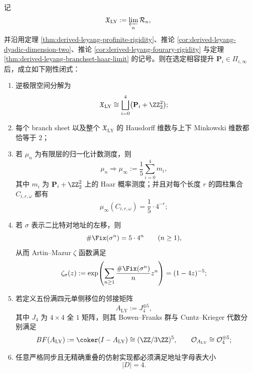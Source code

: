 \begin{theorem}\label{thm:derived-leyang-branch-tower-fourary-haar-ck-rigidity}
记
\[
\mathfrak X_{\mathrm{LY}}:=\varprojlim_n \mathcal R_n,
\]
并沿用定理 \ref{thm:derived-leyang-profinite-rigidity}、推论 \ref{cor:derived-leyang-dyadic-dimension-two}、推论 \ref{cor:derived-leyang-fourary-rigidity} 与定理 \ref{thm:derived-leyang-branchset-haar-limit} 的记号。则在选定相容提升 \(\mathbf P_i\in\Pi_{i,\infty}\) 后，成立如下刚性闭式：
\begin{enumerate}
  \item 逆极限空间分解为
  \[
  \mathfrak X_{\mathrm{LY}}
  \cong
  \bigsqcup_{i=0}^{4}\bigl(\mathbf P_i+\ZZ_2^2\bigr);
  \]
  \item 每个 branch sheet 以及整个 \(\mathfrak X_{\mathrm{LY}}\) 的 Hausdorff 维数与上下 Minkowski 维数都恰等于 \(2\)；
  \item 若 \(\mu_n\) 为有限层的归一化计数测度，则
  \[
  \mu_n\Rightarrow \mu_\infty:=\frac15\sum_{i=0}^{4}m_i,
  \]
  其中 \(m_i\) 为 \(\mathbf P_i+\ZZ_2^2\) 上的 Haar 概率测度；并且对每个长度 \(r\) 的圆柱集合 \(C_{i,r,\omega}\) 都有
  \[
  \mu_\infty(C_{i,r,\omega})=\frac15\cdot 4^{-r};
  \]
  \item 若 \(\sigma\) 表示二比特对地址的左移，则
  \[
  \#\Fix(\sigma^n)=5\cdot 4^n
  \qquad (n\ge 1),
  \]
  从而 Artin--Mazur \(\zeta\) 函数满足
  \[
  \zeta_\sigma(z)
  :=
  \exp\!\left(
  \sum_{n\ge 1}\frac{\#\Fix(\sigma^n)}{n}z^n
  \right)
  =
  (1-4z)^{-5};
  \]
  \item 若定义五份满四元单侧移位的邻接矩阵
  \[
  A_{\mathrm{LY}}:=J_4^{\oplus 5},
  \]
  其中 \(J_4\) 为 \(4\times 4\) 全 \(1\) 矩阵，则其 Bowen--Franks 群与 Cuntz--Krieger 代数分别满足
  \[
  BF(A_{\mathrm{LY}})
  :=
  \coker(I-A_{\mathrm{LY}})
  \cong
  (\ZZ/3\ZZ)^5,
  \qquad
  \mathcal O_{A_{\mathrm{LY}}}
  \cong
  \mathcal O_4^{\oplus 5};
  \]
  \item 任意严格同步且无精确重叠的仿射实现都必须满足地址字母表大小
  \[
  |D|=4.
  \]
\end{enumerate}
\end{theorem}

